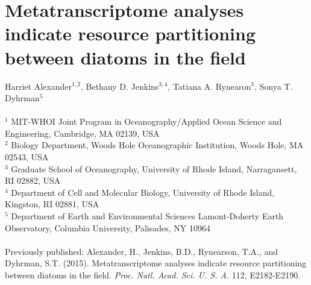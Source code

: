 \chapter{Metatranscriptome analyses indicate resource partitioning between diatoms in the field}
\raggedbottom
\begin{singlespace}
Harriet Alexander$^{1,2}$, Bethany D. Jenkins$^{3,4}$, Tatiana A. Rynearon$^{3}$, Sonya T. Dyhrman$^{5}$\\
\\
$^{1}$ MIT-WHOI Joint Program in Oceanography/Applied Ocean Science and Engineering, Cambridge, MA 02139, USA\\
$^2$ Biology Department, Woods Hole Oceanographic Institution, Woods Hole, MA 02543, USA\\
$^3$ Graduate School of Oceanography, University of Rhode Island, Narragansett, RI 02882, USA\\
$^4$ Department of Cell and Molecular Biology, University of Rhode Island, Kingston, RI 02881, USA\\
$^5$ Department of Earth and Environmental Sciences Lamont-Doherty Earth Observatory, Columbia University, Palisades, NY 10964\\
\\
Previously published: Alexander, H., Jenkins, B.D., Rynearson, T.A., and Dyhrman, S.T. (2015). Metatranscriptome analyses indicate resource partitioning between diatoms in the field. \emph{Proc. Natl. Acad. Sci. U. S. A.} 112, E2182-E2190.

\end{singlespace}
\clearpage
